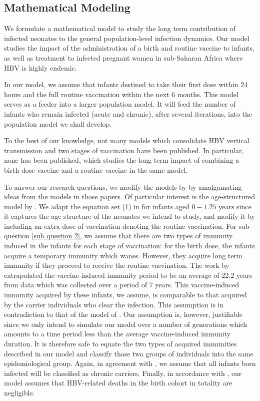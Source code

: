 \subsection{Mathematical Modeling}
We formulate a mathematical model to study the long term contribution of infected neonates to the general population-level infection dynamics. Our model studies the  impact of the administration of a birth and routine vaccine to infants, as well as treatment to infected pregnant women in sub-Saharan Africa where HBV is highly endemic.  

In our model, we assume that infants destined to take their first dose within 24 hours and the full routine vaccination within the next 6 months. This model serves as a feeder into a larger population model. It will feed the number of infants who remain infected (acute and chronic),  after several iterations, into the population model we shall develop.

To the best of our knowledge, not many models which consolidate HBV vertical transmission and two stages of vaccination have been published. In particular, none has been published, which studies the long term impact of combining a birth dose vaccine and a routine vaccine in the same model. 

To answer our research questions, we modify the models by \cite{mann2011modelling_NewZealand,zou2010modeling} by amalgamating ideas from the models in those papers. Of particular interest is the age-structured model by \cite{mann2011modelling_NewZealand}. We adapt the equation set (1) in \cite{mann2011modelling_NewZealand} for infants aged $0-1.25$ years since it captures the age structure of the neonates we intend to study, and modify it by including an extra dose of vaccination denoting the routine vaccination. For sub-question \ref{sub question 2}, we assume that there are two types of immunity induced in the infants for each stage of vaccination: for the birth dose, the infants acquire a temporary immunity which wanes. However, they acquire long term immunity if they proceed to receive the routine vaccination. The work by \cite{mclean1994modelling} extrapolated the vaccine-induced immunity period to be an average of 22.2 years from data which was collected over a period of 7 years. This vaccine-induced immunity acquired by these infants, we assume, is comparable to that acquired by the carrier individuals who clear the infection. This assumption is in contradiction to that of the model of \cite{zou2010modeling}. Our assumption is, however, justifiable since we only intend to simulate our model over a number of generations which amounts to a time period less than the average vaccine-induced immunity duration. It is therefore safe to equate the two types of acquired immunities described in our model and classify those two groups of individuals into the same epidemiological group. Again, in agreement with \cite{zhang2012analysisHBVmodel}, we assume that all infants born infected will be classified as chronic carriers. Finally, in accordance with \cite{mann2011modelling_NewZealand}, our model assumes that HBV-related deaths in the birth cohort in totality are negligible.

